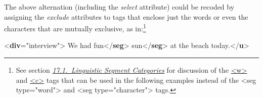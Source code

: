 The above alternation (including the {\itshape select} attribute) could be recoded by assigning the {\itshape exclude} attributes to tags that enclose just the words or even the characters that are mutually exclusive, as in:\footnote{See section \textit{\hyperref[AILC]{17.1.\ Linguistic Segment Categories}} for discussion of the \hyperref[TEI.w]{<w>} and \hyperref[TEI.c]{<c>} tags that can be used in the following examples instead of the <seg type="word"> and <seg type="character"> tags.} \par\bgroup{}\exampleFont \begin{shaded}\noindent\mbox{}{<\textbf{div}\hspace*{1em}{type}="{interview}">}\mbox{}\newline 
{}We had\mbox{}\newline 
{}fun{</\textbf{seg}>}\mbox{}\newline 
\hspace*{1em}sun{</\textbf{seg}>}\mbox{}\newline 
\hspace*{1em}\hspace*{1em} at the beach today.{</\textbf{u}>}\mbox{}\newline 

\end{shaded}

